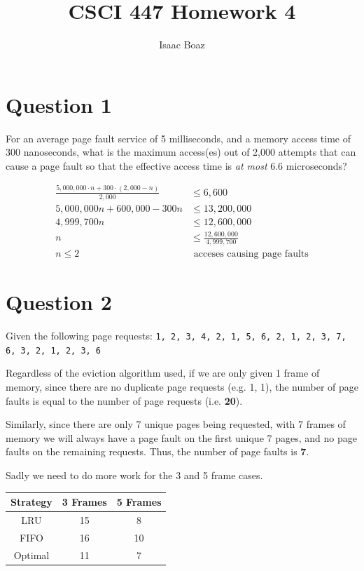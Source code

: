 \documentclass{article}
\author{Isaac Boaz}
\title{CSCI 447 Homework 4}
\begin{document}
\maketitle

\section*{Question 1}
For an average page fault service of 5 milliseconds, and a memory access time of
300 nanoseconds, what is the maximum access(es) out of 2,000 attempts that can
cause a page fault so that the effective access time is \emph{at most} 6.6 microseconds?

\begin{align*}
    \frac{5,000,000 \cdot n + 300 \cdot (2,000 - n)}{2,000} & \leq 6,600                          \\
    5,000,000n + 600,000 - 300n                             & \leq 13,200,000                     \\
    4,999,700n                                              & \leq 12,600,000                     \\
    n                                                       & \leq \frac{12,600,000}{4,999,700}   \\
    n \leq 2                                                & \text{ acceses causing page faults}
\end{align*}

\section*{Question 2}
Given the following page requests:
\texttt{1, 2, 3, 4, 2, 1, 5, 6, 2, 1, 2, 3, 7, 6, 3, 2, 1, 2, 3, 6}

Regardless of the eviction algorithm used, if we are only given 1 frame of memory,
since there are no duplicate page requests (e.g. 1, 1), the number of page faults
is equal to the number of page requests (i.e. \textbf{20}).

Similarly, since there are only 7 unique pages being requested, with 7 frames of
memory we will always have a page fault on the first unique 7 pages, and no page
faults on the remaining requests. Thus, the number of page faults is \textbf{7}.

Sadly we need to do more work for the 3 and 5 frame cases.

\begin{tabular}{c|cc}
    Strategy & 3 Frames & 5 Frames \\
    \hline
    LRU      & 15       & 8        \\
    FIFO     & 16       & 10       \\
    Optimal  & 11       & 7
\end{tabular}
\end{document}
